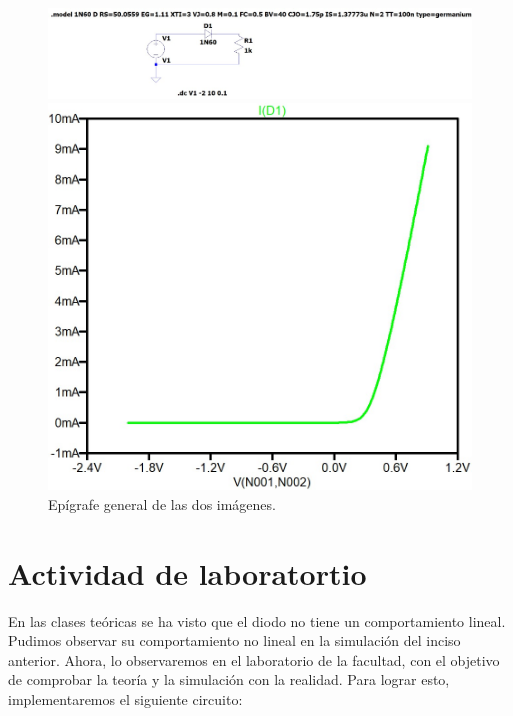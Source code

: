 \documentclass[chaptersright]{informeutn}
\begin{document}
\begin{figure}[h]
  \centering
  \begin{minipage}{0.45\textwidth}
    \centering
    \includegraphics[width=\linewidth]{pictures/curva_diodo_germanio_circuito.jpeg}
  \end{minipage}
  \hfill
  \begin{minipage}{0.45\textwidth}
    \centering
    \includegraphics[width=\linewidth]{pictures/curva_diodo_germanio_grafico.jpeg}
  \end{minipage}

  \vspace{0.5cm}
  
  \caption{Epígrafe general de las dos imágenes.}
\end{figure}


\newpage

  \section{Actividad de laboratortio}
    En las clases teóricas se ha visto que el diodo no tiene un comportamiento lineal. Pudimos observar su 
    comportamiento no lineal en la simulación del inciso anterior. Ahora, lo observaremos en el laboratorio de la
    facultad, con el objetivo de comprobar la teoría y la simulación con la realidad. Para lograr esto, implementaremos
    el siguiente circuito:
\end{document}
